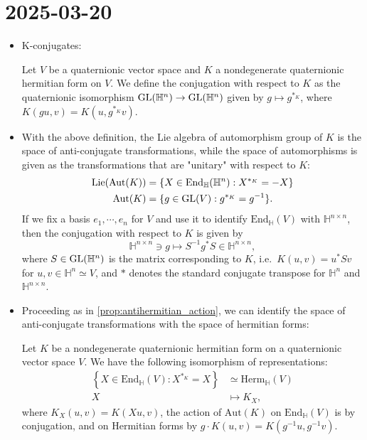 \documentclass{report}
\begin{document}
\section{2025-03-20}
\begin{itemize}
    \item K-conjugates:
    \begin{definition}
        Let $V$ be a quaternionic vector space and $K$ a nondegenerate quaternionic hermitian form on $V$.
        We define the conjugation with respect to $K$ as the quaternionic isomorphism $\operatorname{{\mathrm{GL}}}(\mathbb H^n) \to \operatorname{{\mathrm{GL}}}(\mathbb H^n)$ given by $g \mapsto g^{*_K}$, where $K(g u, v) = K(u, g^{*_K} v)$.
    \end{definition}
    \item With the above definition, the Lie algebra of automorphism group of $K$ is the space of anti-conjugate transformations, while the space of automorphisms is given as the transformations that are "unitary" with respect to $K$:
    \begin{align*}
        \mathrm{Lie}(\mathrm{Aut}(K)) &= \{ X \in \mathrm{End}_\mathbb H(\mathbb H^n) : X^{*_K} = -X \}\\
        \mathrm{Aut}(K) &= \{ g \in \operatorname{{\mathrm{GL}}}(V) : g^{*_K} = g^{-1} \}.
    \end{align*}
    If we fix a basis $e_1, \cdots, e_n$ for $V$ and use it to identify $\mathrm{End}_\mathbb H(V)$ with $\mathbb H^{n \times n}$, then the conjugation with respect to $K$ is given by
    \[
    \mathbb H^{n \times n} \ni g \mapsto S^{-1} g^* S \in \mathbb H^{n \times n},
    \]
    where $S \in \operatorname{{\mathrm{GL}}}(\mathbb H^n)$ is the matrix corresponding to $K$, i.e.\ $K(u,v) = u^* S v$ for $u, v \in \mathbb H^n \simeq V$, and $*$ denotes the standard conjugate transpose for $\mathbb H^n$ and $\mathbb H^{n \times n}$.
    \item Proceeding as in \cref{prop:antihermitian_action}, we can identify the space of anti-conjugate transformations with the space of hermitian forms:
    \begin{proposition}
        Let $K$ be a nondegenerate quaternionic hermitian form on a quaternionic vector space $V$.
        We have the following isomorphism of representations:
        \begin{align*}
            \left\{ X \in \mathrm{End}_\mathbb H(V) : X^{*_K} = X \right\} &\simeq \mathrm{Herm}_\mathbb H(V) \\
            X &\mapsto K_X,
        \end{align*}
        where $K_X(u,v) = K(Xu, v)$, the action of $\mathrm{Aut}(K)$ on $\mathrm{End}_\mathbb H(V)$ is by conjugation, and on Hermitian forms by $g \cdot K(u,v) = K(g^{-1}u, g^{-1}v)$.

\end{proposition}
\end{itemize}
\end{document}
